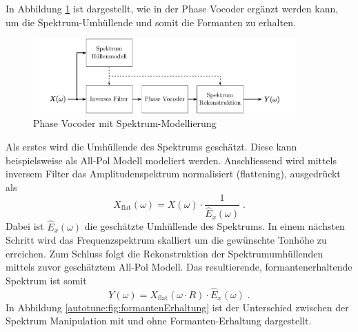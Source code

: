 In Abbildung \ref{autotune:fig:pitchShiftingSpektrumModellierung} ist dargestellt, wie in der Phase Vocoder ergänzt werden kann,
um die Spektrum-Umhüllende und somit die Formanten zu erhalten.
\begin{figure}
    \centering
    \includegraphics[width=0.9\textwidth]{papers/autotune/images/Spektrum-Modellierung.pdf}
    \caption{Phase Vocoder mit Spektrum-Modellierung}
    \label{autotune:fig:pitchShiftingSpektrumModellierung}
\end{figure}
Als erstes wird die Umhüllende des Spektrums geschätzt.
Diese kann beispielsweise als All-Pol Modell modeliert werden.
Anschliessend wird mittels inversem Filter das Amplitudenspektrum normalisiert (flattening), ausgedrückt als
\begin{equation}
    X_{\text{flat}}(\omega)
    =
    X(\omega) \cdot \frac{1}{\hat{E}_x(\omega)} \;.
\end{equation}
Dabei ist $\hat{E}_x(\omega)$ die geschätzte Umhüllende des Spektrums.
In einem nächsten Schritt wird das Frequenzspektrum skalliert um die gewünschte Tonhöhe zu erreichen.
Zum Schluss folgt die Rekonstruktion der Spektrumumhüllenden mittels zuvor geschätztem All-Pol Modell.
Das resultierende, formantenerhaltende Spektrum ist somit
\begin{equation}
    Y(\omega)
    =
    X_{\text{flat}}(\omega \cdot R) \cdot \hat{E}_x(\omega) \;.
\end{equation}
In Abbildung \ref{autotune:fig:formantenErhaltung} ist der Unterschied zwischen der Spektrum Manipulation mit und ohne Formanten-Erhaltung dargestellt.

